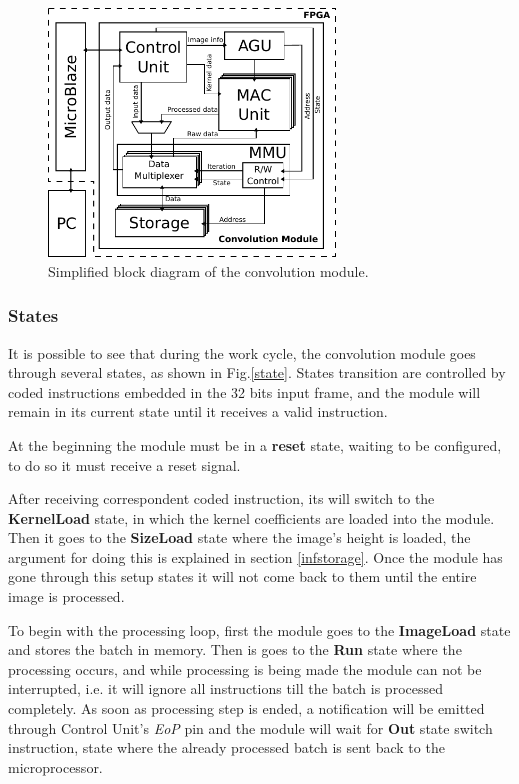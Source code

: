 \documentclass[conference,compsoc]{IEEEtran}
\begin{document}
\begin{figure}[!t]
\centering
\includegraphics[width=3in]{general.pdf}
\caption{Simplified block diagram of the convolution module.}
\label{general}
\end{figure}

\subsubsection{States}
It is possible to see that during the work cycle, the convolution module goes
through several states, as shown in Fig.\ref{state}.
States transition are controlled by coded instructions embedded in the 32 bits input frame,
and the module will remain in its current state until it receives a valid instruction.

At the beginning the module must be in a \textbf{reset} state, waiting to be
configured, to do so it must receive a reset signal.



After receiving correspondent coded instruction, its will switch to the \textbf{KernelLoad} state,
in which the kernel coefficients are loaded into the module. Then it goes to the \textbf{SizeLoad}
state where the image's height is loaded, the argument for doing this is explained in
section \ref{infstorage}. Once the module has gone through this setup states it
will not come back to them until the entire image is processed.

To begin with the processing loop, first the module goes to the \textbf{ImageLoad} state and
stores the batch in memory. Then is goes to the \textbf{Run} state where the
processing occurs, and while processing is being made the module can not be interrupted, i.e.
it will ignore all instructions till the batch is processed completely. As soon as 
processing step is ended, a notification will be emitted through Control Unit's
\textit{EoP} pin and the module will wait for \textbf{Out} state switch instruction, state where the 
already processed batch is sent back to the microprocessor.
\end{document}
